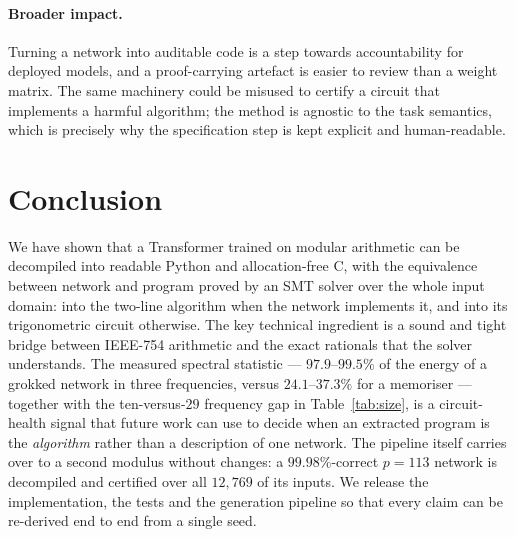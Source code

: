 \documentclass[11pt]{article}
\begin{document}
\paragraph{Broader impact.}
Turning a network into auditable code is a step towards accountability for
deployed models, and a proof-carrying artefact is easier to review than a weight
matrix. The same machinery could be misused to certify a circuit that implements
a harmful algorithm; the method is agnostic to the task semantics, which is
precisely why the specification step is kept explicit and human-readable.

\section{Conclusion}
\label{sec:conclusion}

We have shown that a Transformer trained on modular arithmetic can be
decompiled into readable Python and allocation-free C, with the equivalence
between network and program proved by an SMT solver over the whole input domain:
into the two-line algorithm when the network implements it, and into its
trigonometric circuit otherwise. The key technical ingredient is a sound and
tight bridge between IEEE-754 arithmetic and the exact rationals that the solver
understands. The measured spectral statistic --- $97.9$--$99.5\%$ of the energy of
a grokked network in three frequencies, versus $24.1$--$37.3\%$ for a memoriser ---
together with the ten-versus-$29$ frequency gap in Table~\ref{tab:size}, is a
circuit-health signal that future work can use to decide when an extracted
program is the \emph{algorithm} rather than a description of one network. The
pipeline itself carries over to a second modulus without changes: a
$99.98\%$-correct $p=113$ network is decompiled and certified over all $12{,}769$
of its inputs. We release
the implementation, the tests and the generation pipeline so that every claim
can be re-derived end to end from a single seed.

\end{document}
